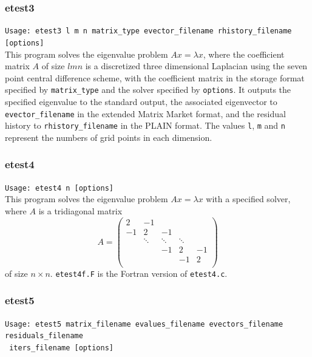 \documentclass[a4paper]{article}
\begin{document}
\subsubsection{etest3}

\verb+Usage: etest3 l m n matrix_type evector_filename rhistory_filename [options]+\\

This program solves the eigenvalue problem $Ax = \lambda x$, where the 
coefficient matrix $A$ of size $lmn$ is a discretized three dimensional Laplacian using the seven
point central difference scheme, with the coefficient matrix in the storage format specified
by \verb|matrix_type| and the solver specified by {\tt options}. 
It outputs the specified eigenvalue to the standard output, 
the associated eigenvector to {\tt evector\_filename} in the
extended Matrix Market format, and
the residual history to {\tt rhistory\_filename} 
in the PLAIN format. 
The values {\tt l}, {\tt m} and {\tt n} represent the numbers of grid
points in each dimension. 

\subsubsection{etest4}

\verb+Usage: etest4 n [options]+\\

This program solves the eigenvalue problem $Ax = \lambda x$ with a specified 
solver, where $A$ is a tridiagonal matrix
\[
A = 
\left(
\begin{array}{ccccc}
2 & -1 &   &  &   \\
-1 & 2 & -1 &  &   \\
  & \ddots  & \ddots  & \ddots  &   \\
  &   & -1 & 2 & -1 \\
  &   &   & -1 & 2 \\
\end{array}
\right)
\]
of size $n \times n$.
{\tt etest4f.F} is the Fortran version of {\tt etest4.c}.

\subsubsection{etest5}

\verb+Usage: etest5 matrix_filename evalues_filename evectors_filename residuals_filename +\\
\verb+ iters_filename [options] +\\
\end{document}
